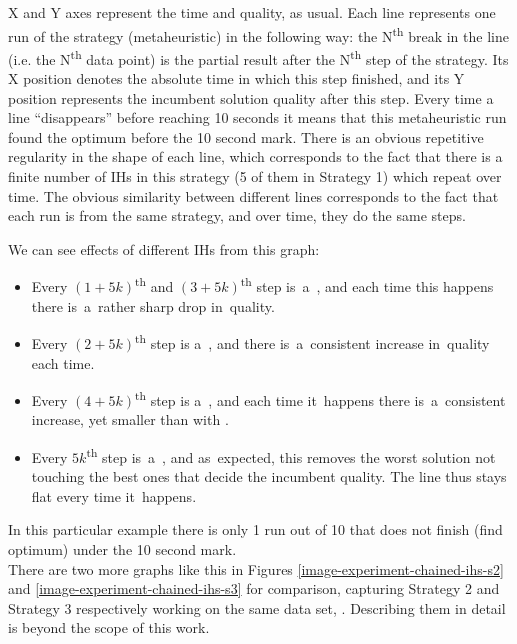 X and Y axes represent the time and quality, as usual. Each line represents one run of the strategy (metaheuristic) in the following way: the N\textsuperscript{th} break in the line (i.e. the N\textsuperscript{th} data point) is the partial result after the N\textsuperscript{th} step of the strategy. Its X position denotes the absolute time in which this step finished, and its Y position represents the incumbent solution quality after this step. Every time a line ``disappears'' before reaching 10 seconds it means that this metaheuristic run found the optimum before the 10 second mark. There is an obvious repetitive regularity in the shape of each line, which corresponds to the fact that there is a finite number of IHs in this strategy (5 of them in Strategy 1) which repeat over time. The obvious similarity between different lines corresponds to the fact that each run is from the same strategy, and over time, they do the same steps.

We can see effects of different IHs from this graph:
\begin{itemize}
	\item Every $(1 + 5k)$\textsuperscript{th} and $(3 + 5k)$\textsuperscript{th} step is~a~, and each time this happens there is~a~rather sharp drop in~quality.
	\item Every $(2 + 5k)$\textsuperscript{th} step is a~, and there is~a~consistent increase in~quality each time.
	\item Every $(4 + 5k)$\textsuperscript{th} step is a~, and each time it~happens there is~a~consistent increase, yet smaller than with .
	\item Every $5k$\textsuperscript{th} step is~a~, and as~expected, this removes the worst solution not touching the best ones that decide the incumbent quality. The line thus stays flat every time it~happens.
\end{itemize}

In this particular example there is only 1 run out of 10 that does not finish (find optimum) under the 10 second mark.\\

There are two more graphs like this in Figures \ref{image-experiment-chained-ihs-s2} and \ref{image-experiment-chained-ihs-s3} for comparison, capturing Strategy 2 and Strategy 3 respectively working on the same data set, . Describing them in detail is beyond the scope of this work.\\

